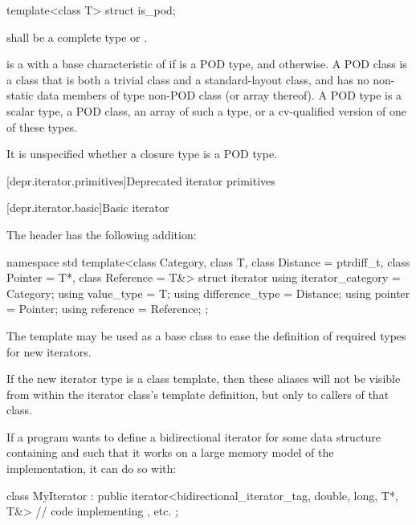 \begin{itemdecl}
template<class T> struct is_pod;
\end{itemdecl}

\begin{itemdescr}
\pnum
\requires
{} shall be a complete type or \cv{} .

\pnum
{} is a 
with a base characteristic of 
if  is a POD type,
and  otherwise.
%
A POD class is a class that is both a trivial class and a standard-layout class,
and has no non-static data members of type non-POD class (or array thereof).
A POD type is a scalar type, a POD class, an array of such a type,
or a cv-qualified version of one of these types.

\pnum
\begin{note}
It is unspecified whether a closure type is a POD type.
\end{note}
\end{itemdescr}

[depr.iterator.primitives]{Deprecated iterator primitives}

[depr.iterator.basic]{Basic iterator}

\pnum
The header
%
 has the following addition:

%
\begin{codeblock}
namespace std {
  template<class Category, class T, class Distance = ptrdiff_t,
           class Pointer = T*, class Reference = T&>
  struct iterator {
    using iterator_category = Category;
    using value_type        = T;
    using difference_type   = Distance;
    using pointer           = Pointer;
    using reference         = Reference;
  };
}
\end{codeblock}

\pnum
The
template may be used as a base class to ease the definition of required types
for new iterators.

\pnum
\begin{note} If the new iterator type is a class template, then these aliases
will not be visible from within the iterator class's template definition, but
only to callers of that class.\end{note}

\pnum
\begin{example}
If a \Cpp{} program wants to define a bidirectional iterator for some data
structure containing  and such that it works on a large memory
model of the implementation, it can do so with:

\begin{codeblock}
class MyIterator :
  public iterator<bidirectional_iterator_tag, double, long, T*, T&> {
  // code implementing \tcode{++}, etc.
};
\end{codeblock}
\end{example}

